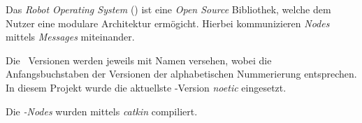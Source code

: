 



Das \textit{Robot Operating System} (\ROS) ist eine \textit{Open Source} Bibliothek, welche dem Nutzer eine modulare Architektur ermögicht.
Hierbei kommunizieren \textit{Nodes} mittels \textit{Messages} miteinander.

Die \ROS\ Versionen werden jeweils mit Namen versehen, wobei die Anfangsbuchstaben der Versionen der alphabetischen Nummerierung entsprechen. In diesem Projekt wurde die aktuellste \ROS-Version \textit{noetic} eingesetzt.

Die \ROS\textit{-Nodes} wurden mittels \textit{catkin} compiliert.























